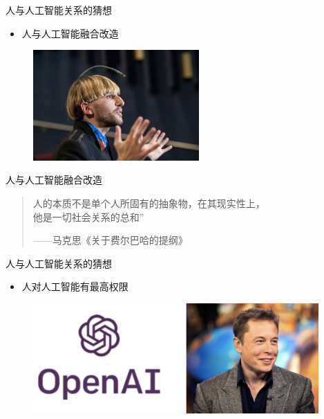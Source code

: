 \documentclass{beamer}
\begin{document}
  \begin{frame}{人与人工智能关系的猜想}
    \begin{itemize}
     \item  人与人工智能融合改造
    \end{itemize}
   \begin{figure}[H]
   \centering
   \includegraphics[width=2.5in]{gtyPic1.jpg}
   \end{figure}
  \end{frame}

  \begin{frame}{人与人工智能融合改造}
  \begin{quote}
    \hspace*{0.21in} 人的本质不是单个人所固有的抽象物，在其现实性上，\\
    他是一切社会关系的总和”
    \begin{flushright}
    ——马克思《关于费尔巴哈的提纲》
    \end{flushright}
  \end{quote}
  \end{frame}

 \begin{frame}{人与人工智能关系的猜想}
    \begin{itemize}
     \item  人对人工智能有最高权限
    \end{itemize}

   \begin{figure}[H]
   \centering
   \includegraphics[width=4.3in]{gtyPic2.jpg}
   \end{figure}

  \end{frame}
\end{document}
